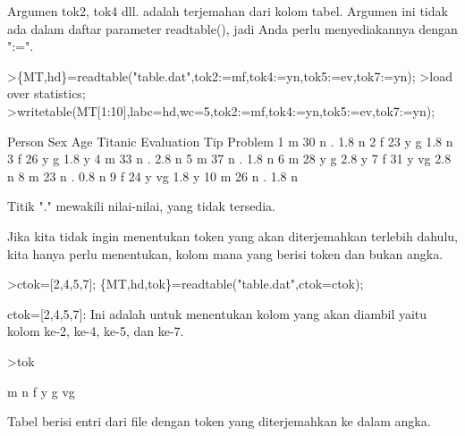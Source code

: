 \documentclass{article}
\begin{document}
\begin{eulernotebook}
\begin{eulercomment}
\begin{eulercomment}
\begin{eulercomment}
Argumen tok2, tok4 dll. adalah terjemahan dari kolom tabel. Argumen
ini tidak ada dalam daftar parameter readtable(), jadi Anda perlu
menyediakannya dengan ":=".
\end{eulercomment}
\begin{eulerprompt}
>\{MT,hd\}=readtable("table.dat",tok2:=mf,tok4:=yn,tok5:=ev,tok7:=yn);
>load over statistics;
>writetable(MT[1:10],labc=hd,wc=5,tok2:=mf,tok4:=yn,tok5:=ev,tok7:=yn);
\end{eulerprompt}
\begin{euleroutput}
   Person  Sex  Age Titanic Evaluation  Tip Problem
        1    m   30       n          .  1.8       n
        2    f   23       y          g  1.8       n
        3    f   26       y          g  1.8       y
        4    m   33       n          .  2.8       n
        5    m   37       n          .  1.8       n
        6    m   28       y          g  2.8       y
        7    f   31       y         vg  2.8       n
        8    m   23       n          .  0.8       n
        9    f   24       y         vg  1.8       y
       10    m   26       n          .  1.8       n
\end{euleroutput}
\begin{eulercomment}
Titik "." mewakili nilai-nilai, yang tidak tersedia.

Jika kita tidak ingin menentukan token yang akan diterjemahkan
terlebih dahulu, kita hanya perlu menentukan, kolom mana yang berisi
token dan bukan angka.
\end{eulercomment}
\begin{eulerprompt}
>ctok=[2,4,5,7]; \{MT,hd,tok\}=readtable("table.dat",ctok=ctok);
\end{eulerprompt}
\begin{eulercomment}
ctok=[2,4,5,7]: Ini adalah untuk menentukan kolom yang akan diambil
yaitu kolom ke-2, ke-4, ke-5, dan ke-7.
\end{eulercomment}
\begin{eulerprompt}
>tok
\end{eulerprompt}
\begin{euleroutput}
  m
  n
  f
  y
  g
  vg
\end{euleroutput}
\begin{eulercomment}
Tabel berisi entri dari file dengan token yang diterjemahkan ke dalam
angka.


\end{eulercomment}
\end{eulercomment}
\end{eulercomment}
\end{eulernotebook}
\end{document}
